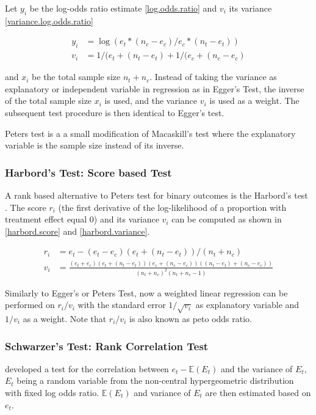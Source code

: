 \documentclass[11pt,a4paper,twoside]{book}\usepackage[]{graphicx}\usepackage[]{color}
\begin{document}
\vspace{0mm}
Let $y_i$ be the log-odds ratio estimate \ref{log.odds.ratio} and $v_{i}$ its variance \ref{variance.log.odds.ratio}

\begin{align}
y_{i} &= \log(e_{t}*(n_{c} - e_{c})/e_{c}*(n_{t} - e_{t})) \label{log.odds.ratio}\\
v_{i} &= 1/(e_{t}+(n_{t} - e_{t}) + 1/(e_{c}+(n_{c} - e_{c}) \label{variance.log.odds.ratio}
\end{align}

and $x_{i}$ be the total sample size $n_{t} + n_{c}$. Instead of taking the variance as explanatory or independent variable in regression as in Egger's Test, the inverse of the total sample size $x_{i}$ is used, and the variance $v_{i}$ is used as a weight. The subsequent test procedure is then identical to Egger's test. 

\vspace{0mm}
Peters test is a a small modification of Macaskill's test where the explanatory variable is the sample size instead of its inverse.


\subsubsection{Harbord's Test: Score based Test}
A rank based alternative to Peters test for binary outcomes is the Harbord's test \citep{Harbord}. The score $r_{i}$ (the first derivative of the log-likelihood of a proportion with treatment effect equal 0) and its variance $v_{i}$ can be computed as shown in \ref{harbord.score} and \ref{harbord.variance}.

\begin{align}
r_{i} &= e_{t} - (e_{t} - e_{c})(e_{t} + (n_{t} - e_{t}))/(n_{t} + n_{c}) \label{harbord.score} \\
v_{i} &= \frac{(e_{t} + e_{c})(e_{t} + (n_{t} - e_{t}))(e_{c} + (n_{c} - e_{c}))((n_{t} - e_{t}) + (n_{c} - e_{c}))}{(n_{t} + n_{c})^2(n_{t} + n_{c} - 1)} \label{harbord.variance}
\end{align}

Similarly to Egger's or Peters Test, now a weighted linear regression can be performed on $r_{i}/v_{i}$ with the standard error $1/\sqrt{v_{i}}$ as explanatory variable and $1/v_{i}$ as a weight. Note that $r_{i}/v_{i}$ is also known as peto odds ratio. 

\subsubsection{Schwarzer's Test: Rank Correlation Test}
\citet{Schwarzer} developed a test for the correlation between $e_{t} - \mathbb{E}(E_{t})$ and the variance of $E_{t}$, $E_{t}$ being a random variable from the non-central hypergeometric distribution with fixed log odds ratio. $\mathbb{E}(E_{t})$ and variance of $E_{t}$ are then estimated based on $e_{t}$.
\end{document}
